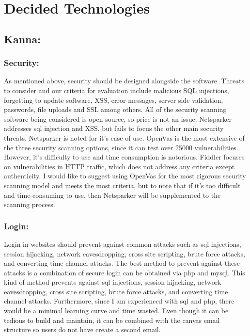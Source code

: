 \documentclass[letterpaper,10pt,titlepage,journal,compsoc,draftclsnofoot,onecolumn]{IEEEtran}
\newcommand\tab[1][1cm]{\hspace*{#1}}
\begin{document}
\section{Decided Technologies}

\subsection{Kanna:}
\subsubsection{Security:}
\tab As mentioned above, security should be designed alongside the software. Threats to consider and our criteria for evaluation include malicious SQL injections, forgetting to update software, XSS, error messages, server side validation, passwords, file uploads and SSL among others. All of the security scanning software being considered is open-source, so price is not an issue. Netsparker addresses sql injection and XSS, but fails to focus the other main security threats. Netsparker is noted for it’s ease of use. OpenVas is the most extensive of the three security scanning options, since it can test over 25000 vulnerabilities. However, it’s difficulty to use and time consumption is notorious. Fiddler focuses on vulnerabilities in HTTP traffic, which does not address any criteria except authenticity. I would like to suggest using OpenVas for the most rigorous security scanning model and meets the most criteria, but to note that if it’s too difficult and time-consuming to use, then Netsparker will be supplemented to the scanning process. \newline

\subsubsection{Login:}
\tab Login in websites should prevent against common attacks such as sql injections, session hijacking, network eavesdropping, cross site scripting, brute force attacks,  and converting time channel attacks. The best method to prevent against these attacks is a combination of secure login can be obtained via php and mysql. This kind of method prevents against sql injections, session hijacking, network eavesdropping, cross site scripting, brute force attacks,  and converting time channel attacks. Furthermore, since I am experienced with sql and php, there would be a minimal learning curve and time wasted. Even though it can be tedious to build and maintain, it can be combined with the canvas email structure so users do not have create a second email. \newline
\end{document}
